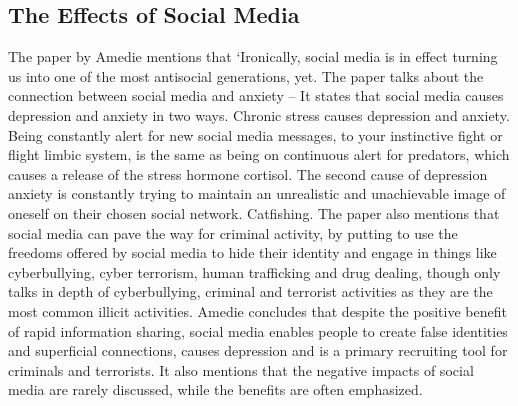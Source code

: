 \documentclass[lettersize,journal]{IEEEtran}
\begin{document}
\subsection{The Effects of Social Media}
    The paper by Amedie \cite{Amedie 2015} mentions that ‘Ironically, social
    media is in effect turning us into one of the most antisocial generations,
    yet. The paper talks about the connection between social media and anxiety
    – It states that social media causes depression and anxiety in two ways. Chronic
    stress causes depression and anxiety. Being constantly alert for new social
    media messages, to your instinctive fight or flight limbic system, is the
    same as being on continuous alert for predators, which causes a release of
    the stress hormone cortisol. The second cause of depression anxiety is
    constantly trying to maintain an unrealistic and unachievable image of
    oneself on their chosen social network. Catfishing. The paper also mentions
    that social media can pave the way for criminal activity, by putting to use
    the freedoms offered by social media to hide their identity and engage in
    things like cyberbullying, cyber terrorism, human trafficking and drug dealing,
    though only talks in depth of cyberbullying, criminal and terrorist activities
    as they are the most common illicit activities. Amedie concludes that despite
    the positive benefit of rapid information sharing, social media enables people
    to create false identities and superficial connections, causes depression and
    is a primary recruiting tool for criminals and terrorists. It also mentions
    that the negative impacts of social media are rarely discussed, while the benefits
    are often emphasized.
\end{document}

